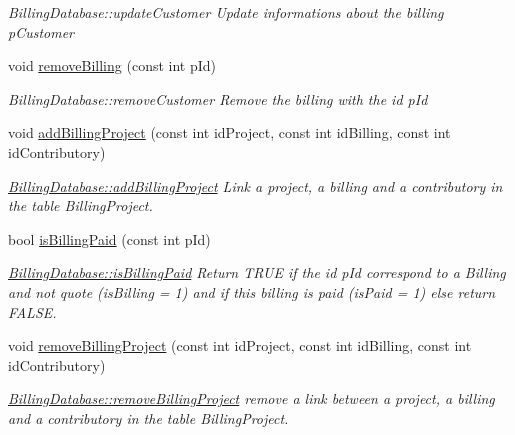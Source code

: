 \begin{DoxyCompactItemize}
\begin{DoxyCompactList}\small\item\em Billing\-Database\-::update\-Customer Update informations about the billing {\itshape p\-Customer} \end{DoxyCompactList}\item 
void \hyperlink{classDatabases_1_1BillingDatabase_aa6869fce7290e50723b5db5e125e9a6e}{remove\-Billing} (const int p\-Id)
\begin{DoxyCompactList}\small\item\em Billing\-Database\-::remove\-Customer Remove the billing with the id {\itshape p\-Id} \end{DoxyCompactList}\item 
void \hyperlink{classDatabases_1_1BillingDatabase_ab4eb6ce0f1126599012912d4869ad8b8}{add\-Billing\-Project} (const int id\-Project, const int id\-Billing, const int id\-Contributory)
\begin{DoxyCompactList}\small\item\em \hyperlink{classDatabases_1_1BillingDatabase_ab4eb6ce0f1126599012912d4869ad8b8}{Billing\-Database\-::add\-Billing\-Project} Link a project, a billing and a contributory in the table Billing\-Project. \end{DoxyCompactList}\item 
bool \hyperlink{classDatabases_1_1BillingDatabase_a0e1651d61ecec830edf4da0413cda325}{is\-Billing\-Paid} (const int p\-Id)
\begin{DoxyCompactList}\small\item\em \hyperlink{classDatabases_1_1BillingDatabase_a0e1651d61ecec830edf4da0413cda325}{Billing\-Database\-::is\-Billing\-Paid} Return T\-R\-U\-E if the id {\itshape p\-Id} correspond to a Billing and not quote (is\-Billing = 1) and if this billing is paid (is\-Paid = 1) else return F\-A\-L\-S\-E. \end{DoxyCompactList}\item 
void \hyperlink{classDatabases_1_1BillingDatabase_ad6320bcb8053fc0097939221546f7ecf}{remove\-Billing\-Project} (const int id\-Project, const int id\-Billing, const int id\-Contributory)
\begin{DoxyCompactList}\small\item\em \hyperlink{classDatabases_1_1BillingDatabase_ad6320bcb8053fc0097939221546f7ecf}{Billing\-Database\-::remove\-Billing\-Project} remove a link between a project, a billing and a contributory in the table Billing\-Project. \end{DoxyCompactList}\item 

\end{DoxyCompactItemize}
